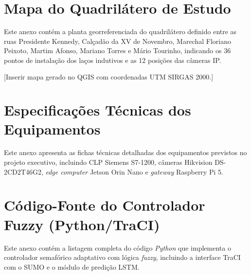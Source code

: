\documentclass[12pt,a4paper,oneside]{abntex2}
\begin{document}
\begin{anexosenv}
\chapter{Mapa do Quadrilátero de Estudo}
Este anexo contém a planta georreferenciada do quadrilátero definido entre as ruas Presidente Kennedy, Calçadão da XV de Novembro, Marechal Floriano Peixoto, Martim Afonso, Mariano Torres e Mário Tourinho, indicando os 36 pontos de instalação dos laços indutivos e as 12 posições das câmeras IP.

\vspace{1cm}
[Inserir mapa gerado no QGIS com coordenadas UTM SIRGAS 2000.]

\chapter{Especificações Técnicas dos Equipamentos}
Este anexo apresenta as fichas técnicas detalhadas dos equipamentos previstos no projeto executivo, incluindo CLP Siemens S7-1200, câmeras Hikvision DS-2CD2T46G2, \textit{edge computer} Jetson Orin Nano e \textit{gateway} Raspberry Pi 5.

\chapter{Código-Fonte do Controlador Fuzzy (Python/TraCI)}
Este anexo contém a listagem completa do código \textit{Python} que implementa o controlador semafórico adaptativo com lógica \textit{fuzzy}, incluindo a interface TraCI com o SUMO e o módulo de predição LSTM.

\end{anexosenv}
\end{document}
